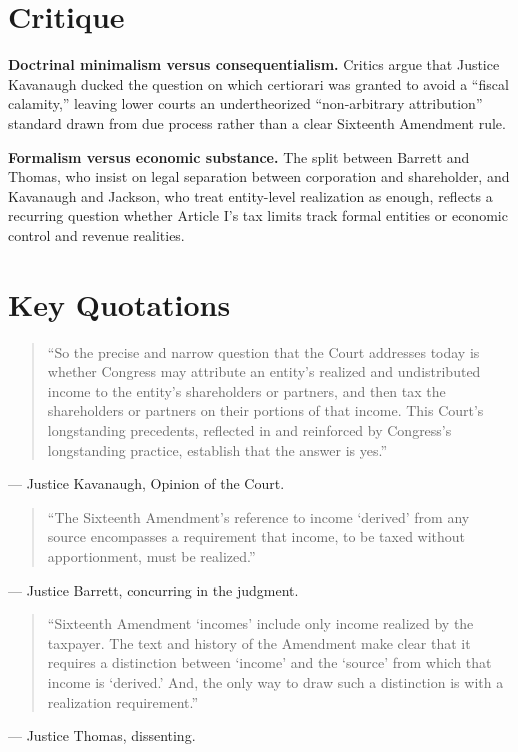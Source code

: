 \documentclass[12pt]{article}
\begin{document}
\section{Critique}

\textbf{Doctrinal minimalism versus consequentialism.} Critics argue that Justice Kavanaugh ducked the question on which certiorari was granted to avoid a ``fiscal calamity,'' leaving lower courts an undertheorized ``non-arbitrary attribution'' standard drawn from due process rather than a clear Sixteenth Amendment rule.

\textbf{Formalism versus economic substance.} The split between Barrett and Thomas, who insist on legal separation between corporation and shareholder, and Kavanaugh and Jackson, who treat entity-level realization as enough, reflects a recurring question whether Article I's tax limits track formal entities or economic control and revenue realities.

\section{Key Quotations}

\begin{quote}
``So the precise and narrow question that the Court addresses today is whether Congress may attribute an entity's realized and undistributed income to the entity's shareholders or partners, and then tax the shareholders or partners on their portions of that income. This Court's longstanding precedents, reflected in and reinforced by Congress's longstanding practice, establish that the answer is yes.''
\end{quote}
\noindent --- Justice Kavanaugh, Opinion of the Court.

\begin{quote}
``The Sixteenth Amendment's reference to income `derived' from any source encompasses a requirement that income, to be taxed without apportionment, must be realized.''
\end{quote}
\noindent --- Justice Barrett, concurring in the judgment.

\begin{quote}
``Sixteenth Amendment `incomes' include only income realized by the taxpayer. The text and history of the Amendment make clear that it requires a distinction between `income' and the `source' from which that income is `derived.' And, the only way to draw such a distinction is with a realization requirement.''
\end{quote}
\noindent --- Justice Thomas, dissenting.
\end{document}

